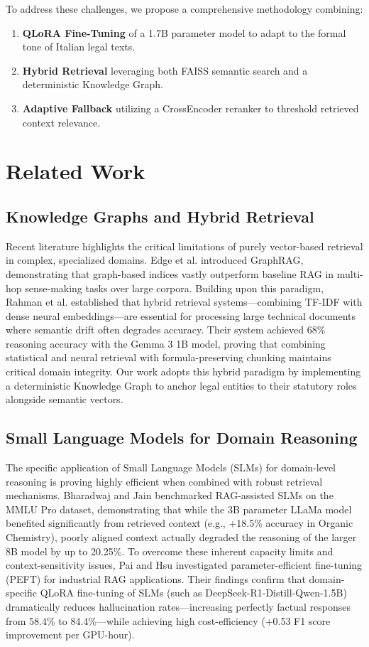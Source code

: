 \documentclass[11pt,a4paper]{article}
\begin{document}
To address these challenges, we propose a comprehensive methodology combining:
\begin{enumerate}
    \item \textbf{QLoRA Fine-Tuning} of a 1.7B parameter model to adapt to the formal tone of Italian legal texts.
    \item \textbf{Hybrid Retrieval} leveraging both FAISS semantic search and a deterministic Knowledge Graph.
    \item \textbf{Adaptive Fallback} utilizing a CrossEncoder reranker to threshold retrieved context relevance.
\end{enumerate}

\section{Related Work}

\subsection{Knowledge Graphs and Hybrid Retrieval}
Recent literature highlights the critical limitations of purely vector-based retrieval in complex, specialized domains. Edge et al. \cite{edge2024graphrag} introduced GraphRAG, demonstrating that graph-based indices vastly outperform baseline RAG in multi-hop sense-making tasks over large corpora. Building upon this paradigm, Rahman et al. \cite{hybridmlslm2024} established that hybrid retrieval systems---combining TF-IDF with dense neural embeddings---are essential for processing large technical documents where semantic drift often degrades accuracy. Their system achieved 68\% reasoning accuracy with the Gemma 3 1B model, proving that combining statistical and neural retrieval with formula-preserving chunking maintains critical domain integrity. Our work adopts this hybrid paradigm by implementing a deterministic Knowledge Graph to anchor legal entities to their statutory roles alongside semantic vectors. 

\subsection{Small Language Models for Domain Reasoning}
The specific application of Small Language Models (SLMs) for domain-level reasoning is proving highly efficient when combined with robust retrieval mechanisms. Bharadwaj and Jain \cite{ragassistedslm2024} benchmarked RAG-assisted SLMs on the MMLU Pro dataset, demonstrating that while the 3B parameter LLaMa model benefited significantly from retrieved context (e.g., +18.5\% accuracy in Organic Chemistry), poorly aligned context actually degraded the reasoning of the larger 8B model by up to 20.25\%. To overcome these inherent capacity limits and context-sensitivity issues, Pai and Hsu \cite{pai2026finetuning} investigated parameter-efficient fine-tuning (PEFT) for industrial RAG applications. Their findings confirm that domain-specific QLoRA fine-tuning of SLMs (such as DeepSeek-R1-Distill-Qwen-1.5B) dramatically reduces hallucination rates---increasing perfectly factual responses from 58.4\% to 84.4\%---while achieving high cost-efficiency (+0.53 F1 score improvement per GPU-hour).
\end{document}
